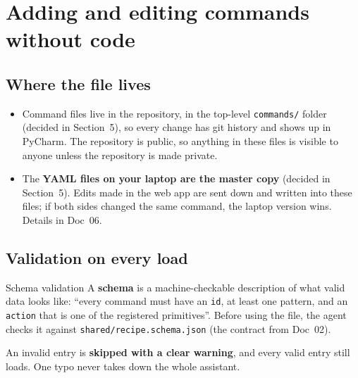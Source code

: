 \documentclass[11pt,a4paper]{article}
\begin{document}
\section{Adding and editing commands without code}

\subsection{Where the file lives}
\begin{itemize}[nosep]
  \item Command files live in the repository, in the top-level \texttt{commands/} folder
        (decided in Section~5), so every change has git history and shows up in PyCharm.
        The repository is public, so anything in these files is visible to anyone unless the
        repository is made private.
  \item The \textbf{YAML files on your laptop are the master copy} (decided in Section~5). Edits
        made in the web app are sent down and written into these files; if both sides changed
        the same command, the laptop version wins. Details in Doc~06.
\end{itemize}

\subsection{Validation on every load}
\begin{concept}{Schema validation}
A \textbf{schema} is a machine-checkable description of what valid data looks like:
``every command must have an \texttt{id}, at least one pattern, and an \texttt{action} that is
one of the registered primitives''. Before using the file, the agent checks it against
\texttt{shared/recipe.schema.json} (the contract from Doc~02).
\end{concept}

\noindent An invalid entry is \textbf{skipped with a clear warning}, and every valid entry still
loads. One typo never takes down the whole assistant.
\end{document}
